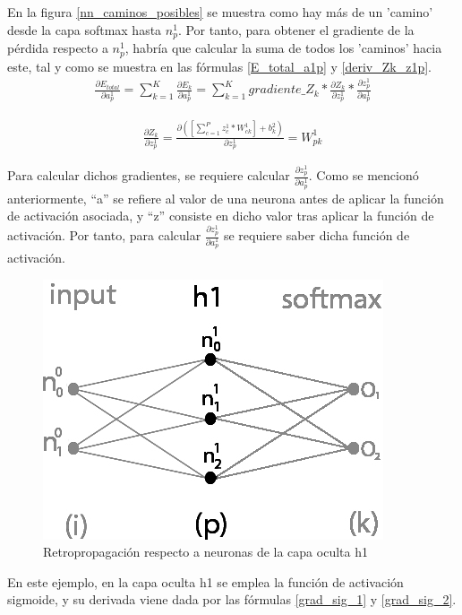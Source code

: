 En la figura \ref{nn_caminos_posibles} se muestra como hay más de un 'camino' desde la capa softmax hasta $n^1_p$. Por tanto, para obtener el gradiente de la pérdida respecto a $n^1_p$, habría que calcular la suma de todos los 'caminos' hacia este, tal y como se muestra en las fórmulas \ref{E_total_a1p} y \ref{deriv_Zk_z1p}. \\

\begin{gather}
	\frac{\partial E_{total}}{\partial a^1_p} = \sum_{k=1}^K \frac{\partial E_k}{\partial a^1_p} = \sum_{k=1}^K  gradiente\_Z_k * \frac{\partial Z_k}{\partial z^1_p} * \frac{\partial z^1_p}{\partial a^1_p}
	\label{E_total_a1p}
\end{gather}

\begin{gather}
	\frac{\partial Z_k}{\partial z^1_p} = \frac{\partial( [\sum_{c=1}^{P} z^1_c * W^1_{ck}] + b^2_k)}{\partial z^1_p} = W^1_{pk}
	\label{deriv_Zk_z1p}
\end{gather}

Para calcular dichos gradientes, se requiere calcular $\frac{\partial z^1_p}{\partial a^1_p}$. Como se mencionó anteriormente, ``a'' se refiere al valor de una neurona antes de aplicar la función de activación asociada, y ``z'' consiste en dicho valor tras aplicar la función de activación. Por tanto, para calcular $\frac{\partial z^1_p}{\partial a^1_p}$ se requiere saber dicha función de activación.

\begin{figure}[H]
	\centering
	\includegraphics[scale=0.35]{imagenes/nn_1_capa_h1.jpg}  
	\caption{Retropropagación respecto a neuronas de la capa oculta h1}
	\label{fig:nn_1_capa_h1}
\end{figure}

En este ejemplo, en la capa oculta h1 se emplea la función de activación sigmoide, y su derivada viene dada por las fórmulas \ref{grad_sig_1} y \ref{grad_sig_2}. 

